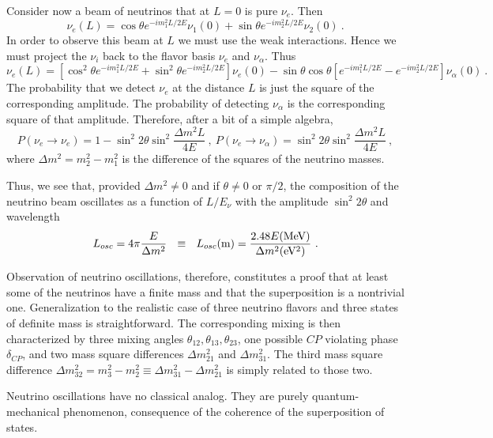 {{Consider now a beam of neutrinos that at $L=0$ is pure $\nu_e$. Then
\begin{equation}
\nu_e (L) = \cos \theta e^{-i m_1^2 L/2E} \nu_1(0) + \sin \theta e^{-i m_2^2 L/2E} \nu_2 (0) ~.
\end{equation}
In order to observe this beam at $L$ we must use the weak interactions. Hence we must project the $\nu_i$ back to the flavor basis $\nu_e$ and $\nu_{\alpha}$.
Thus
\begin{equation}
\nu_e (L) = [\cos^2 \theta e^{-i m_1^2 L/2E} + \sin^2 \theta e^{-i m_2^2 L/2E}] \nu_e(0) - 
\sin \theta \cos \theta [e^{-i m_1^2 L/2E} - e^{-i m_2^2 L/2E}] \nu_{\alpha}(0) ~.
\end{equation}
The probability that we detect $\nu_e$ at the distance $L$ is just the square of the corresponding amplitude. The probability
of detecting $\nu_{\alpha}$ is the corresponding square of that amplitude. Therefore, after a bit of a simple algebra,
\begin{equation}
P(\nu_e \rightarrow \nu_e) = 1 - \sin^2 2 \theta \sin^2 \frac{\Delta m^2 L}{4 E} ~,~ P(\nu_e \rightarrow \nu_{\alpha}) =  \sin^2 2 \theta \sin^2 \frac{\Delta m^2 L}{4 E} ~,
\end{equation}
where $\Delta m^2 = m^2_2 - m^2_1$ is the difference of the squares of the neutrino masses. 

Thus, we see that, provided $\Delta m^2 \ne 0$ and if $\theta \ne 0$ or $\pi/2$, the composition of the neutrino beam oscillates as a function of $L/E_{\nu}$ 
with the amplitude $\sin^2 2 \theta$ and wavelength
\begin{equation}
L_{osc} = 4 \pi \frac{E}{\Delta m^2} ~~\equiv ~~ L_{osc} ({\rm m}) = \frac{2.48 E {\rm (MeV)}}{ \Delta m^2 {\rm (eV^2)}} ~. 
\end{equation}

Observation of neutrino oscillations, therefore, constitutes a proof that at least some of the neutrinos have a finite mass and that the superposition is
a nontrivial one. Generalization to the realistic case of three neutrino flavors and three
states of definite mass is straightforward. The corresponding mixing is then characterized by three mixing angles $\theta_{12}, \theta_{13}, \theta_{23}$,
 one possible $CP$ violating phase $\delta_{CP}$,
and two mass square differences $\Delta m^2_{21}$ and  $\Delta m^2_{31}$. The third mass square difference 
$\Delta m^2_{32} = m^2_3 - m^2_2 \equiv \Delta m^2_{31} - \Delta m^2_{21}$ is simply related
to those two. 

Neutrino oscillations have no classical analog. They are purely quantum-mechanical phenomenon, consequence of the coherence of the
superposition of states.

    }%
}

\vspace{10pt}

\twocolumngrid

